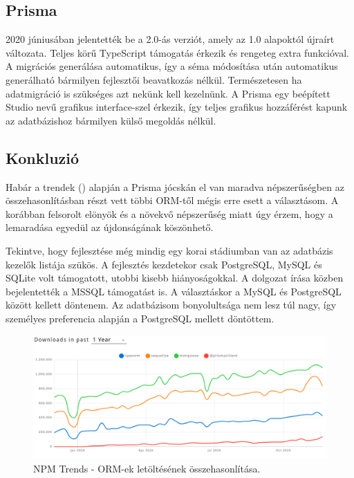 \subsection{Prisma}
2020 júniusában jelentették be a 2.0-ás verziót, amely az 1.0 alapoktól újraírt változata.
Teljes körű TypeScript támogatás érkezik és rengeteg extra funkcióval.
A migrációs generálása automatikus, így a séma módosítása után automatikus generálható bármilyen fejlesztői beavatkozás nélkül.
Természetesen ha adatmigráció is szükséges azt nekünk kell kezelnünk.
A Prisma egy beépített Studio nevű grafikus interface-szel érkezik, így teljes grafikus hozzáférést kapunk az adatbázishoz bármilyen külső megoldás nélkül.


\subsection{Konkluzió}
Habár a trendek () alapján a Prisma jócskán el van maradva népszerűségben az összehasonlításban részt vett többi ORM-től mégis erre esett a választásom.
A korábban felsorolt elönyök és a növekvő népszerűség miatt úgy érzem, hogy a lemaradása egyedül az újdonságának köszönhető.

Tekintve, hogy fejlesztése még mindig egy korai stádiumban van az adatbázis kezelők listája szükös.
A fejlesztés kezdetekor csak PostgreSQL, MySQL és SQLite volt támogatott, utobbi kisebb hiányoságokkal.
A dolgozat írása közben bejelentették a MSSQL támogatást is. 
A választáskor a MySQL és PostgreSQL között kellett döntenem.
Az adatbázisom bonyolultsága nem lesz túl nagy, így személyes preferencia alapján a PostgreSQL mellett döntöttem.

\begin{figure}[!ht]
  \centering
  \includegraphics[width=150mm, keepaspectratio]{figures/orm_npm_trends.png}
  \caption{NPM Trends - ORM-ek letöltésének összehasonlítása.}
  \label{fig:ORMTrends}
\end{figure}

